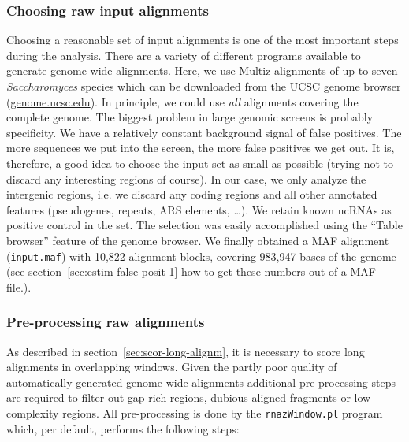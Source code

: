 \documentclass[11pt]{article}
\begin{document}
\subsubsection{Choosing raw input alignments}

Choosing a reasonable set of input alignments is one of the most
important steps during the analysis. There are a variety of different
programs available to generate genome-wide alignments. Here, we use
Multiz alignments of up to seven \emph{Saccharomyces} species which
can be downloaded from the UCSC genome browser
(\url{genome.ucsc.edu}). In principle, we could use \emph{all}
alignments covering the complete genome.  The biggest problem in large
genomic screens is probably specificity. We have a relatively constant
background signal of false positives. The more sequences we put into
the screen, the more false positives we get out. It is, therefore, a
good idea to choose the input set as small as possible (trying not to
discard any interesting regions of course). In our case, we only
analyze the intergenic regions, i.e. we discard any coding regions and
all other annotated features (pseudogenes, repeats, ARS elements,
\dots).  We retain known ncRNAs as positive control in the set.  The
selection was easily accomplished using the ``Table browser'' feature
of the genome browser. We finally obtained a MAF alignment
(\texttt{input.maf}) with 10,822 alignment blocks, covering 983,947
bases of the genome (see section~\ref{sec:estim-false-posit-1} how to
get these numbers out of a MAF file.).

\subsubsection{Pre-processing raw alignments}

As described in section~\ref{sec:scor-long-alignm}, it is necessary to
score long alignments in overlapping windows. Given the partly poor
quality of automatically generated genome-wide alignments additional
pre-processing steps are required to filter out gap-rich regions,
dubious aligned fragments or low complexity regions. All
pre-processing is done by the \texttt{rnazWindow.pl} program which,
per default, performs the following steps:
\end{document}

